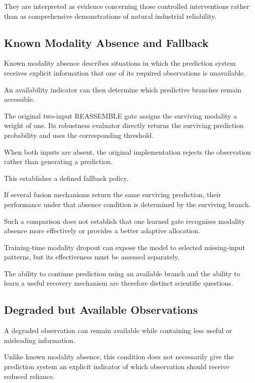 They are interpreted as evidence concerning those controlled interventions rather than as comprehensive demonstrations of natural industrial reliability.

\subsection{Known Modality Absence and Fallback}

Known modality absence describes situations in which the prediction system receives explicit information that one of its required observations is unavailable.

An availability indicator can then determine which predictive branches remain accessible.

The original two-input REASSEMBLE gate assigns the surviving modality a weight of one. Its robustness evaluator directly returns the surviving prediction probability and uses the corresponding threshold.

When both inputs are absent, the original implementation rejects the observation rather than generating a prediction.

This establishes a defined fallback policy.

If several fusion mechanisms return the same surviving prediction, their performance under that absence condition is determined by the surviving branch.

Such a comparison does not establish that one learned gate recognises modality absence more effectively or provides a better adaptive allocation.

Training-time modality dropout can expose the model to selected missing-input patterns, but its effectiveness must be assessed separately.

The ability to continue prediction using an available branch and the ability to learn a useful recovery mechanism are therefore distinct scientific questions.

\subsection{Degraded but Available Observations}

A degraded observation can remain available while containing less useful or misleading information.

Unlike known modality absence, this condition does not necessarily give the prediction system an explicit indicator of which observation should receive reduced reliance.

